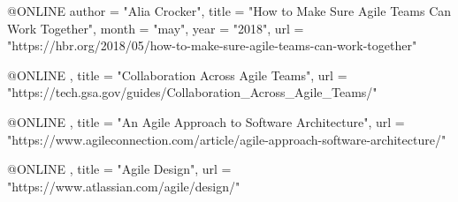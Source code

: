 

@ONLINE {
    author = "Alia Crocker",
    title  = "How to Make Sure Agile Teams Can Work Together",
    month  = "may",
    year   = "2018",
    url    = "https://hbr.org/2018/05/how-to-make-sure-agile-teams-can-work-together"
}

@ONLINE {,
    title = "Collaboration Across Agile Teams",
    url   = "https://tech.gsa.gov/guides/Collaboration_Across_Agile_Teams/"
}

@ONLINE {,
    title = "An Agile Approach to Software Architecture",
    url   = "https://www.agileconnection.com/article/agile-approach-software-architecture/"
}

@ONLINE {,
    title = "Agile Design",
    url   = "https://www.atlassian.com/agile/design/"
}





